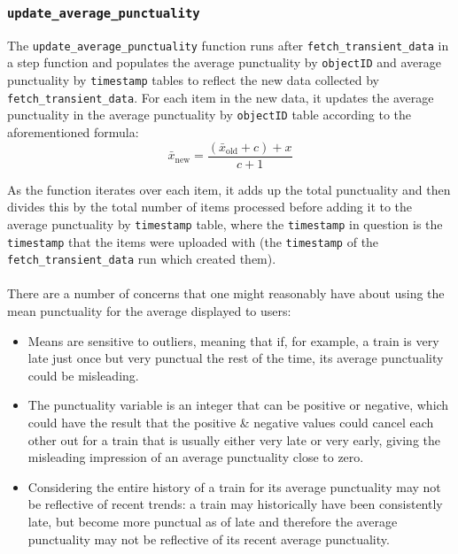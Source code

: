 \documentclass[a4paper,11pt]{report}
\begin{document}
\subsubsection{\texttt{update_average_punctuality}}
The \verb|update_average_punctuality| function runs after \verb|fetch_transient_data| in a step function and populates the average punctuality by \verb|objectID| and average punctuality by \verb|timestamp| tables to reflect the new data collected by \verb|fetch_transient_data|.
For each item in the new data, it updates the average punctuality in the average punctuality by \verb|objectID| table according to the aforementioned formula:
\[
  \bar{x}_{\text{new}} = \frac{\left( \bar{x}_\text{old} + c \right) + x}{c + 1}
\]

As the function iterates over each item, it adds up the total punctuality and then divides this by the total number of items processed before adding it to the average punctuality by \verb|timestamp| table, where the \verb|timestamp| in question is the \verb|timestamp| that the items were uploaded with (the \verb|timestamp| of the \verb|fetch_transient_data| run which created them).
\\\\
There are a number of concerns that one might reasonably have about using the mean punctuality for the average displayed to users:
\begin{itemize}
  \item   Means are sensitive to outliers, meaning that if, for example, a train is very late just once but very punctual the rest of the time, its average punctuality could be misleading.
  \item   The punctuality variable is an integer that can be positive or negative, which could have the result that the positive \& negative values could cancel each other out for a train that is usually either very late or very early, giving the misleading impression of an average punctuality close to zero.
  \item   Considering the entire history of a train for its average punctuality may not be reflective of recent trends:
          a train may historically have been consistently late, but become more punctual as of late and therefore the average punctuality may not be reflective of its recent average punctuality. 
\end{itemize}
\end{document}
